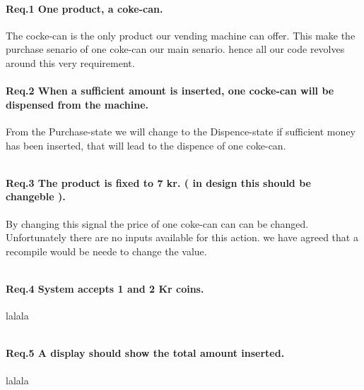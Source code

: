 \paragraph{Req.1 One product, a coke-can.}
The cocke-can is the only product our vending machine can offer. This make the purchase senario of one coke-can our main senario. hence all our code revolves around this very requirement.

\paragraph{Req.2 When a sufficient amount is inserted, one cocke-can will be dispensed from the machine.} From the Purchase-state we will change to the Dispence-state if sufficient money has been inserted, that will lead to the dispence of one coke-can.

\begin{lstlisting}[caption={[VHDL]eks. text }]

\end{lstlisting}
  
\paragraph{Req.3 The product is fixed to 7 kr. ( in design this should be changeble ).} By changing this signal the price of one coke-can can can be changed. Unfortunately there are no inputs available for this action. we have agreed that a recompile would be neede to change the value. 
\begin{lstlisting}[caption={[VHDL]eks. text }]

\end{lstlisting}


\paragraph{Req.4 System accepts 1 and 2 Kr coins.}
lalala
\begin{lstlisting}[caption={[VHDL]eks. text }]

\end{lstlisting}
 

\paragraph{Req.5 A display should show the total amount inserted.}
lalala
\begin{lstlisting}[caption={[VHDL]eks. text }]

\end{lstlisting}
  

